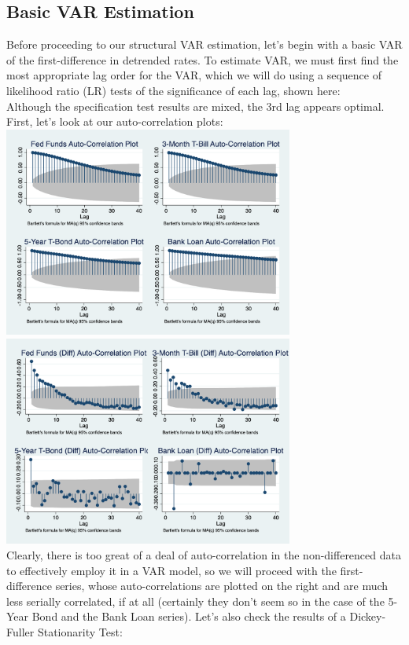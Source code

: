 \documentclass[12pt,final]{article}
\begin{document}
\subsection{Basic VAR Estimation}
Before proceeding to our structural VAR estimation, let's begin with a basic VAR of the first-difference in detrended rates. To estimate VAR, we must first find the most appropriate lag order for the VAR, which we will do using a sequence of likelihood ratio (LR) tests of the significance of each lag, shown here:
 \\
Although the specification test results are mixed, the 3rd lag appears optimal. First, let's look at our auto-correlation plots: \\
\includegraphics[width=3.75in]{var_ac.png} \includegraphics[width=3.75in]{var_ac_diff.png} \\
Clearly, there is too great of a deal of auto-correlation in the non-differenced data to effectively employ it in a VAR model, so we will proceed with the first-difference series, whose auto-correlations are plotted on the right and are much less serially correlated, if at all (certainly they don't seem so in the case of the 5-Year Bond and the Bank Loan series). Let's also check the results of a Dickey-Fuller Stationarity Test: \\
\end{document}
